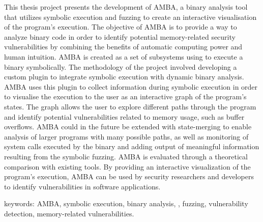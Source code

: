
This thesis project presents the development of AMBA, a binary analysis
tool that utilizes symbolic execution and fuzzing to create an interactive
visualisation of the program's execution. The objective of AMBA is to provide
a way to analyze binary code in order to identify potential memory-related security
vulnerabilities by combining the benefits of automatic computing power and
human intuition. AMBA is created as a set of subsystems using \stoe{} to
execute a binary symbolically. The methodology of the project involved
developing a custom \stoe{} plugin to integrate symbolic execution with
dynamic binary analysis. AMBA uses this plugin to collect information during
symbolic execution in order to visualise the execution to the user as an
interactive graph of the program's states. The graph allows the user to explore 
different paths through the program and identify potential vulnerabilities 
related to memory usage, such as buffer overflows. AMBA could in the future  
be extended with state-merging to enable analysis of larger programs with 
many possible paths, as well as monitoring of system calls executed by the binary and 
adding output of meaningful information resulting from the symbolic fuzzing. AMBA 
is evaluated through a theoretical comparison with existing tools. By providing 
an interactive visualization of the program's execution, AMBA can be used by 
security researchers and developers to identify vulnerabilities in 
software applications.


keywords: AMBA, symbolic execution, binary analysis, \stoe{},
fuzzing, vulnerability detection, memory-related vulnerabilities.
